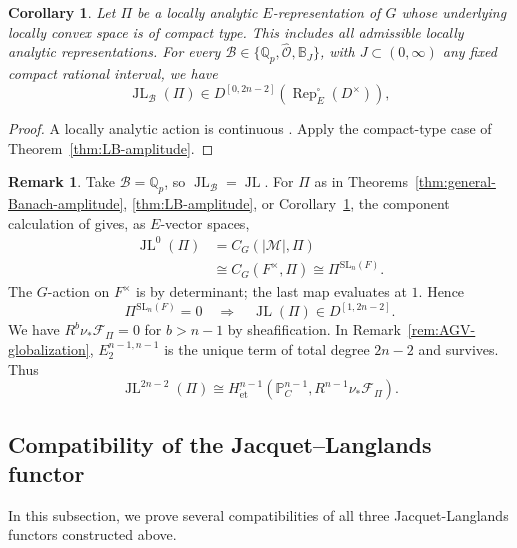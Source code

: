 \documentclass[11pt]{article}
\newtheorem{corollary}[theorem]{Corollary}
\theoremstyle{definition}
\newtheorem{remark}[theorem]{Remark}
\newcommand{\Qp}{\mathbb Q_p}
\newcommand{\cM}{\mathcal M}
\newcommand{\cF}{\mathcal F}
\newcommand{\Period}{\mathbb P_C^{n-1}}
\newcommand{\et}{\mathrm{\acute et}}
\newcommand{\JL}{\operatorname{JL}}
\newcommand{\Rep}{\operatorname{Rep}}
\begin{document}
\begin{corollary}%
\label{cor:locally-analytic-amplitude}
Let \(\Pi\) be a locally analytic \(E\)-representation of
\(G\) whose underlying locally convex space is of compact type.
This includes all admissible locally analytic representations.
For every \(\mathscr B\in\{\Qp,\widehat{\mathscr O},\mathbb B_J\}\),
with \(J\subset(0,\infty)\) any fixed compact rational interval, we have
\begin{equation*}
 \JL_{\mathscr B}(\Pi)
 \in D^{[0,2n-2]}(\Rep_E^\square(D^\times)),
\end{equation*}
\end{corollary}
\begin{proof}
A locally analytic action is continuous
\cite[Definition~3.6.9 and the subsequent discussion]{EmertonAnalytic}.
Apply the compact-type case of Theorem~\ref{thm:LB-amplitude}.
\end{proof}

\begin{remark}%
\label{rem:amplitude-endpoints}
Take \(\mathscr B=\Qp\), so \(\JL_{\mathscr B}=\JL\).  For \(\Pi\) as in Theorems~\ref{thm:general-Banach-amplitude},
\ref{thm:LB-amplitude}, or
Corollary~\ref{cor:locally-analytic-amplitude}, the component
calculation of \cite[Proposition~4.7]{Scholze} gives, as
\(E\)-vector spaces,
\begin{align*}
 \JL^0(\Pi)&=C_G(|\cM|,\Pi)\\
 &\cong C_G(F^\times,\Pi)\cong \Pi^{\mathrm{SL}_n(F)}.
\end{align*}
The \(G\)-action on \(F^\times\) is by determinant; the last
map evaluates at \(1\).  Hence
\begin{equation*}
 \Pi^{\mathrm{SL}_n(F)}=0
 \quad\Longrightarrow\quad \JL(\Pi)\in D^{[1,2n-2]}.
\end{equation*}
We have \(R^b\nu_*\cF_\Pi=0\) for \(b>n-1\) by sheafification.
In Remark~\ref{rem:AGV-globalization}, \(E_2^{n-1,n-1}\)
is the unique term of total degree \(2n-2\) and survives.  Thus
\begin{equation}\label{eq:JL-top-degree-Leray}
 \JL^{2n-2}(\Pi)\cong
 H^{n-1}_{\et}(\Period,R^{n-1}\nu_*\cF_\Pi).
\end{equation}
\end{remark}



\subsection{Compatibility of the Jacquet--Langlands functor}
In this subsection, we prove several compatibilities of all three Jacquet-Langlands functors constructed above.
\end{document}

